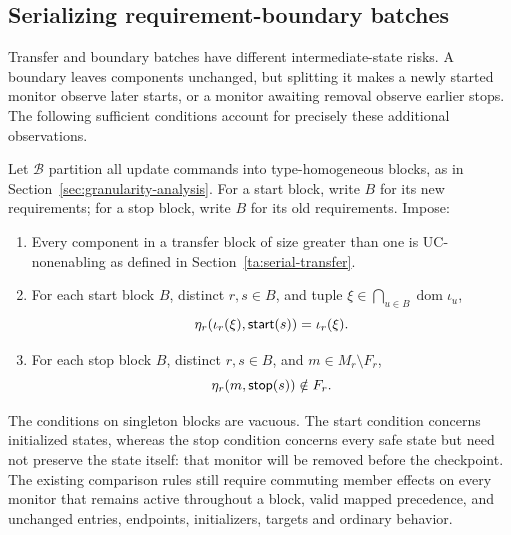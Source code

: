 \subsection{Serializing requirement-boundary batches}\label{ta:serial-boundary}
Transfer and boundary batches have different intermediate-state risks. A boundary leaves components unchanged, but splitting it makes a newly started monitor observe later starts, or a monitor awaiting removal observe earlier stops. The following sufficient conditions account for precisely these additional observations.

Let $\mathcal B$ partition all update commands into type-homogeneous blocks, as in Section~\ref{sec:granularity-analysis}. For a start block, write $B$ for its new requirements; for a stop block, write $B$ for its old requirements. Impose:
\begin{enumerate}
\item Every component in a transfer block of size greater than one is UC-nonenabling as defined in Section~\ref{ta:serial-transfer}.
\item For each start block $B$, distinct $r,s\in B$, and tuple $\xi\in\bigcap_{u\in B}\operatorname{dom}\iota_u$,
\[
 \eta_r(\iota_r(\xi),\mathsf{start}(s))=\iota_r(\xi).
\]
\item For each stop block $B$, distinct $r,s\in B$, and $m\in M_r\setminus F_r$,
\[
 \eta_r(m,\mathsf{stop}(s))\notin F_r.
\]
\end{enumerate}
The conditions on singleton blocks are vacuous. The start condition concerns initialized states, whereas the stop condition concerns every safe state but need not preserve the state itself: that monitor will be removed before the checkpoint. The existing comparison rules still require commuting member effects on every monitor that remains active throughout a block, valid mapped precedence, and unchanged entries, endpoints, initializers, targets and ordinary behavior.

